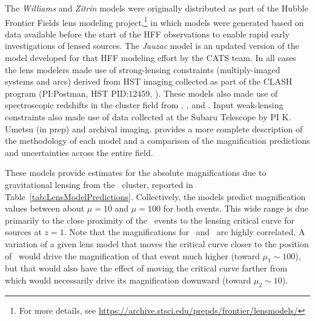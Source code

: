 The {\it Williams} and {\it Zitrin} models were originally distributed
as part of the Hubble Frontier Fields lens modeling
project,\footnote{For more details, see
  \url{https://archive.stsci.edu/prepds/frontier/lensmodels/}} in
which models were generated based on data available before the start
of the HFF observations to enable rapid early investigations of lensed
sources. The {\it Jauzac} model is an updated version of the model
developed for that HFF modeling effort by the CATS team.  In all cases
the lens modelers made use of strong-lensing constraints
(multiply-imaged systems and arcs) derived from HST imaging collected
as part of the CLASH program (PI:Postman, HST PID:12459,
\citealt{Postman:2012}). These models also made use of spectroscopic
redshifts in the cluster field from \citet{Mann:2012},
\citet{Christensen:2012}, and \citet{Grillo:2015a}.  Input
weak-lensing constraints also made use of data collected at the Subaru
Telescope by PI K. Umetsu (in prep) and archival imaging.
\citet{Priewe:2016} provides a more complete description of the
methodology of each model and a comparison of the magnification
predictions and uncertainties across the entire  field.

These models provide estimates for the absolute magnifications due to
gravitational lensing from the \ cluster, reported in
Table~\ref{tab:LensModelPredictions}.  Collectively, the models
predict magnification values between about $\mu=10$ and $\mu=100$ for
both events. This wide range is due primarily to the close proximity
of the \spock\ events to the lensing critical curve for sources at
$z=1$.  Note that the magnifications for \spockone\ and \spocktwo\ are
highly correlated.  A variation of a given lens model that moves the
critical curve closer to the position of \spockone\ would drive the
magnification of that event much higher (toward $\mu_1\sim100$), but
that would also have the effect of moving the critical curve farther
from \spocktwo\, which would necessarily drive its magnification
downward (toward $\mu_2\sim10$).  


